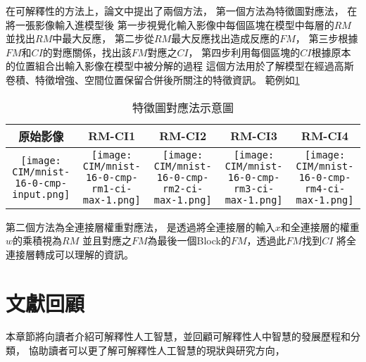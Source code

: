 \documentclass[class=NCU_thesis, crop=false]{standalone}
\begin{document}
在可解釋性的方法上，論文中提出了兩個方法，
第一個方法為特徵圖對應法，
在將一張影像輸入進模型後
第一步視覺化輸入影像中每個區塊在模型中每層的$RM$並找出$RM$中最大反應，
第二步從$RM$最大反應找出造成反應的$FM$，
第三步根據$FM$和$CI$的對應關係，找出該$FM$對應之$CI$，
第四步利用每個區塊的$CI$根據原本的位置組合出輸入影像在模型中被分解的過程
這個方法用於了解模型在經過高斯卷積、特徵增強、空間位置保留合併後所關注的特徵資訊。
範例如\cref{tab:CIM_RMCI_example}

\begin{table}[H]
  \centering
  \begin{tabular}{| c | c | c | c | c |}
    \hline
    原始影像 & RM-CI1 & RM-CI2 & RM-CI3 & RM-CI4 \\
    \hline
    \begin{minipage}[t]{0.18\columnwidth}\centering\texttt{[image: CIM/mnist-16-0-cmp-input.png]}\end{minipage} &
    \begin{minipage}[t]{0.18\columnwidth}\centering\texttt{[image: CIM/mnist-16-0-cmp-rm1-ci-max-1.png]}\end{minipage} &
    \begin{minipage}[t]{0.18\columnwidth}\centering\texttt{[image: CIM/mnist-16-0-cmp-rm2-ci-max-1.png]}\end{minipage} &
    \begin{minipage}[t]{0.18\columnwidth}\centering\texttt{[image: CIM/mnist-16-0-cmp-rm3-ci-max-1.png]}\end{minipage} &
    \begin{minipage}[t]{0.18\columnwidth}\centering\texttt{[image: CIM/mnist-16-0-cmp-rm4-ci-max-1.png]}\end{minipage} 
    \\ \hline
    \end{tabular}
    \caption{特徵圖對應法示意圖\cite{YangCNNInterpretable}}
    \label{tab:CIM_RMCI_example}
\end{table}

第二個方法為全連接層權重對應法，
是透過將全連接層的輸入$x$和全連接層的權重$w$的乘積視為$RM$
並且對應之$FM$為最後一個Block的$FM$，透過此$FM$找到$CI$
將全連接層轉成可以理解的資訊。

\section{文獻回顧}

本章節將向讀者介紹可解釋性人工智慧，並回顧可解釋性人中智慧的發展歷程和分類，
協助讀者可以更了解可解釋性人工智慧的現狀與研究方向，
\end{document}
